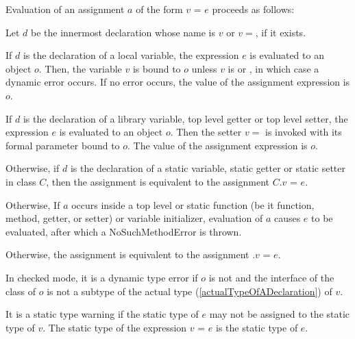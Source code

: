 \documentclass{article}
\newcommand{\code}[1]{{\sf #1}}
\begin{document}
\LMHash{}
Evaluation of an assignment $a$ of the form $v$ \code{=} $e$ proceeds as follows:


 

\LMHash{}
Let $d$ be the innermost declaration whose name is $v$ or $v=$, if it exists.

\LMHash{}
If $d$ is the declaration of a local variable, the expression $e$ is evaluated to an object $o$. Then, the variable $v$ is bound to $o$ unless $v$ is \FINAL{} or \CONST{}, in which case a dynamic error occurs.
If no error occurs, the value of the assignment expression is $o$.  

\LMHash{}
If $d$ is the declaration of a library variable, top level getter or top level setter, the expression $e$ is evaluated to an object $o$. Then the setter $v=$ is invoked with its formal parameter bound to $o$. The value of the assignment expression is $o$.  

\LMHash{}
Otherwise, if $d$ is the declaration of a static variable, static getter or static setter in class $C$, then the assignment is equivalent to the assignment \code{$C.v$ = $e$}.

\LMHash{}
Otherwise, If  $a$ occurs inside a top level or static function (be it function, method, getter,  or setter) or variable initializer, evaluation of $a$ causes $e$ to be evaluated, after which a \code{NoSuchMethodError} is thrown. 

\LMHash{}
Otherwise, the assignment is equivalent to the assignment \code{ \THIS{}.$v$ = $e$}. 

\LMHash{}
In checked mode, it is a dynamic type error if $o$ is not \NULL{} and the interface of the class of $o$ is not a subtype of the actual type (\ref{actualTypeOfADeclaration}) of $v$.

\LMHash{}
It is a static type warning if the static type of $e$ may not be assigned to the static type of $v$. The static type of the expression $v$ \code{=} $e$ is the static type of $e$.
\end{document}
